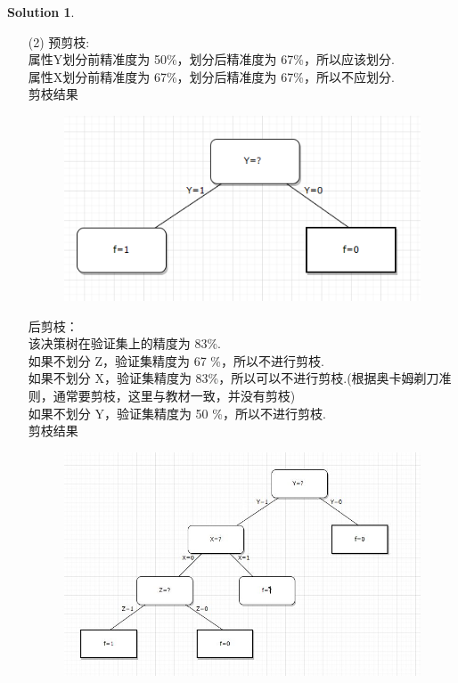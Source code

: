 \documentclass[a4paper,UTF8]{article}
\numberwithin{equation}{section}
\theoremstyle{definition}
\newtheorem*{solution}{Solution}
\begin{document}
\begin{solution}
\begin{enumerate}
		\item[(2)]
		预剪枝: \\
		属性Y划分前精准度为 50\%，划分后精准度为 67\%，所以应该划分. \\
		属性X划分前精准度为 67\%，划分后精准度为 67\%，所以不应划分. \\
		剪枝结果
		\begin{figure}[H]
			\centering
			\includegraphics[scale=0.5]{2.png}
			\label{figure}
		\end{figure}
	
		后剪枝：\\	
		该决策树在验证集上的精度为 83\%. \\
		如果不划分 Z，验证集精度为 67 \%，所以不进行剪枝.\\
		如果不划分 X，验证集精度为 83\%，所以可以不进行剪枝.(根据奥卡姆剃刀准则，通常要剪枝，这里与教材一致，并没有剪枝) \\
		如果不划分 Y，验证集精度为 50 \%，所以不进行剪枝. \\
		剪枝结果
		\begin{figure}[H]
			\centering
			\includegraphics[scale=0.5]{1.png}
			\label{figure}
		\end{figure}
	

\end{enumerate}
\end{solution}
\end{document}
